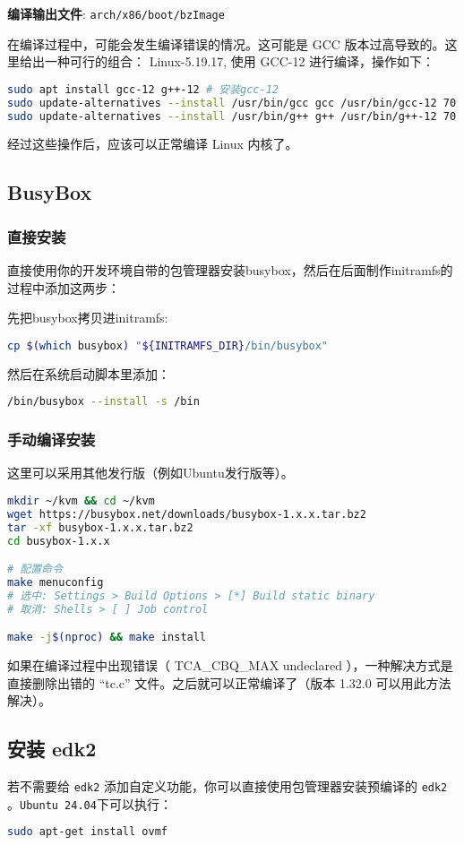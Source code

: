 \textbf{编译输出文件}: \texttt{arch/x86/boot/bzImage}

在编译过程中，可能会发生编译错误的情况。这可能是 GCC 版本过高导致的。这里给出一种可行的组合： Linux-5.19.17, 使用 GCC-12 进行编译，操作如下：

\begin{lstlisting}[language=bash]
sudo apt install gcc-12 g++-12 # 安装gcc-12
sudo update-alternatives --install /usr/bin/gcc gcc /usr/bin/gcc-12 70
sudo update-alternatives --install /usr/bin/g++ g++ /usr/bin/g++-12 70 # 切换 gcc 默认版本
\end{lstlisting}
经过这些操作后，应该可以正常编译 Linux 内核了。

\subsection{BusyBox}
\subsubsection{直接安装}
直接使用你的开发环境自带的包管理器安装busybox，然后在后面制作initramfs的过程中添加这两步：

先把busybox拷贝进initramfs:
\begin{lstlisting}[language=bash]
cp $(which busybox) "${INITRAMFS_DIR}/bin/busybox"
\end{lstlisting}

然后在系统启动脚本里添加：
\begin{lstlisting}[language=bash]
/bin/busybox --install -s /bin
\end{lstlisting}
\subsubsection{手动编译安装}
这里可以采用其他发行版（例如Ubuntu发行版等）。
\begin{lstlisting}[language=bash]
mkdir ~/kvm && cd ~/kvm
wget https://busybox.net/downloads/busybox-1.x.x.tar.bz2
tar -xf busybox-1.x.x.tar.bz2
cd busybox-1.x.x

# 配置命令
make menuconfig
# 选中: Settings > Build Options > [*] Build static binary
# 取消: Shells > [ ] Job control

make -j$(nproc) && make install
\end{lstlisting}
如果在编译过程中出现错误（ TCA\_CBQ\_MAX undeclared ），一种解决方式是直接删除出错的 “tc.c” 文件。之后就可以正常编译了（版本 1.32.0 可以用此方法解决）。

\subsection{安装 edk2}
若不需要给 \texttt{edk2} 添加自定义功能，你可以直接使用包管理器安装预编译的 \texttt{edk2} 。\texttt{Ubuntu 24.04}下可以执行：
\begin{lstlisting}[language=bash]
sudo apt-get install ovmf
\end{lstlisting}

